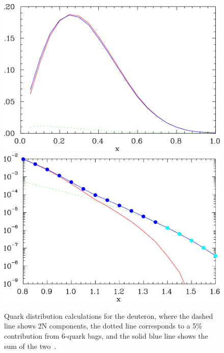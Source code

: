 \begin{figure}[tbp]
\includegraphics[width=1.0\columnwidth]{plots/qofx2_lin_5per} \hfill
\includegraphics[width=1.0\columnwidth]{plots/qofx2_log_5per}
\caption{Quark distribution calculations for the deuteron, where the dashed line shows 2N components, the dotted line corresponds to a 5\% contribution from 6-quark bags, and the solid blue line shows the sum of the two~\cite{Mulders:1983au}. }
\label{fig:quarkbags}
\end{figure}

